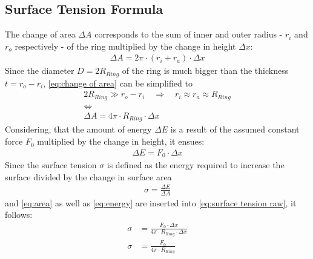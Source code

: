         \subsection{Surface Tension Formula}\label{sec:A2 derive eq.4}%
            The change of area $ \Delta A $ corresponds to the sum of inner and outer radius - $ r_i $ and $ r_o $ respectively - of
            the ring multiplied by the change in height $ \Delta x $:
            \begin{align}
                \Delta A = 2\pi \cdot (r_i + r_a) \cdot \Delta x
                \label{eq:change of area}
            \end{align}
            Since the diameter $ D = 2R_{Ring} $ of the ring is much bigger than the thickness $ t = r_o - r_i $, \cref{eq:change of area}
            can be simplified to
            \begin{equation}
                \begin{gathered}
                    2R_{Ring} \gg r_o-r_i \quad \Rightarrow \quad r_i \approx r_a \approx R_{Ring} \\
                    \Leftrightarrow \\
                    \Delta A = 4\pi \cdot R_{Ring} \cdot \Delta x
                    \label{eq:area}
                \end{gathered}
            \end{equation}
            Considering, that the amount of energy $ \Delta E $ is a result of the assumed constant force $ F_0 $ multiplied
            by the change in height, it ensues:
            \begin{align}
                \Delta E = F_0 \cdot \Delta x
                \label{eq:energy}
            \end{align}
            Since the surface tension $ \sigma $ is defined as the energy required to increase the surface divided by the change in surface area
            \begin{align}
                \sigma = \frac{\Delta E}{\Delta A}
                \label{eq:surface tension raw}
            \end{align}
            and \cref{eq:area} as well as \cref{eq:energy} are inserted into \cref{eq:surface tension raw}, it follows:
            \begin{align}
                \sigma &= \frac{F_0 \cdot \Delta x}{4\pi \cdot R_{Ring} \cdot \Delta x} \nonumber\\
                \sigma &= \frac{F_0}{4\pi \cdot R_{Ring}}
                \label{eq:surface tension}
            \end{align}
